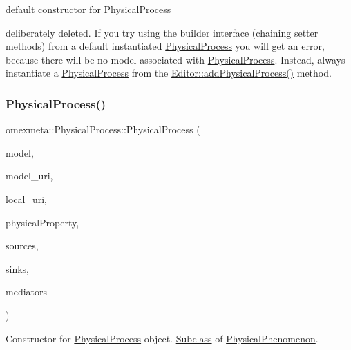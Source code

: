 default constructor for \hyperlink{classomexmeta_1_1PhysicalProcess}{Physical\+Process} 

deliberately deleted. If you try using the builder interface (chaining setter methods) from a default instantiated \hyperlink{classomexmeta_1_1PhysicalProcess}{Physical\+Process} you will get an error, because there will be no model associated with \hyperlink{classomexmeta_1_1PhysicalProcess}{Physical\+Process}. Instead, always instantiate a \hyperlink{classomexmeta_1_1PhysicalProcess}{Physical\+Process} from the \hyperlink{classomexmeta_1_1Editor_ae4a608ecbe64f05c1b64efbeeb1fdeb1}{Editor\+::add\+Physical\+Process()} method. \mbox{\label{classomexmeta_1_1PhysicalProcess_a37f99033da4635ff1af2b9f19c1b84ce}} 
\subsubsection{\texorpdfstring{Physical\+Process()}{PhysicalProcess()}\hspace{0.1cm}{\footnotesize\ttfamily [2/4]}}
{\footnotesize\ttfamily omexmeta\+::\+Physical\+Process\+::\+Physical\+Process (\begin{DoxyParamCaption}\item[{librdf\+\_\+model $\ast$}]{model,  }\item[{std\+::string}]{model\+\_\+uri,  }\item[{std\+::string}]{local\+\_\+uri,  }\item[{const \hyperlink{classomexmeta_1_1PhysicalProperty}{Physical\+Property} \&}]{physical\+Property,  }\item[{Sources}]{sources,  }\item[{Sinks}]{sinks,  }\item[{Mediators}]{mediators }\end{DoxyParamCaption})}



Constructor for \hyperlink{classomexmeta_1_1PhysicalProcess}{Physical\+Process} object. \hyperlink{classSubclass}{Subclass} of \hyperlink{classomexmeta_1_1PhysicalPhenomenon}{Physical\+Phenomenon}. 


